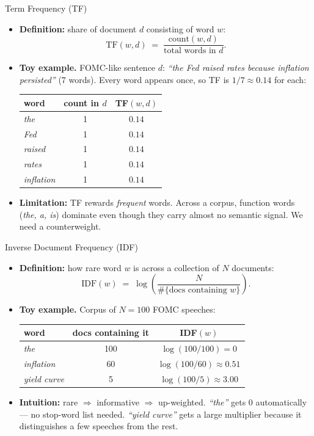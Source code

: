 \begin{frame}{Term Frequency (TF)}
\begin{itemize}
\item \textbf{Definition:} share of document $d$ consisting of word $w$:
\[
   \text{TF}(w, d) \;=\; \frac{\text{count}(w, d)}{\text{total words in } d}.
\]

\medskip
\item \textbf{Toy example.} FOMC-like sentence $d$: \emph{``the Fed raised rates because inflation persisted''} (7 words). Every word appears once, so TF is $1/7 \approx 0.14$ for each:
\begin{center}
\begin{tabular}{l c c}
\toprule
word & count in $d$ & TF$(w,d)$ \\
\midrule
\emph{the} & 1 & $0.14$ \\
\emph{Fed} & 1 & $0.14$ \\
\emph{raised} & 1 & $0.14$ \\
\emph{rates} & 1 & $0.14$ \\
\emph{inflation} & 1 & $0.14$ \\
\bottomrule
\end{tabular}
\end{center}

\medskip
\item \textbf{Limitation:} TF rewards \emph{frequent} words. Across a corpus, function words (\emph{the, a, is}) dominate even though they carry almost no semantic signal. We need a counterweight.
\end{itemize}
\end{frame}

\begin{frame}{Inverse Document Frequency (IDF)}
\begin{itemize}
\item \textbf{Definition:} how rare word $w$ is across a collection of $N$ documents:
\[
   \text{IDF}(w) \;=\; \log\!\left(\frac{N}{\#\{\text{docs containing } w\}}\right).
\]

\medskip
\item \textbf{Toy example.} Corpus of $N = 100$ FOMC speeches:
\begin{center}
\begin{tabular}{l c c}
\toprule
word & docs containing it & IDF$(w)$ \\
\midrule
\emph{the}         & 100 & $\log(100/100) = 0$ \\
\emph{inflation}   & 60  & $\log(100/60) \approx 0.51$ \\
\emph{yield curve} & 5   & $\log(100/5) \approx 3.00$ \\
\bottomrule
\end{tabular}
\end{center}

\medskip
\item \textbf{Intuition:} rare $\Rightarrow$ informative $\Rightarrow$ up-weighted. \emph{``the''} gets $0$ automatically --- no stop-word list needed. \emph{``yield curve''} gets a large multiplier because it distinguishes a few speeches from the rest.
\end{itemize}
\end{frame}


